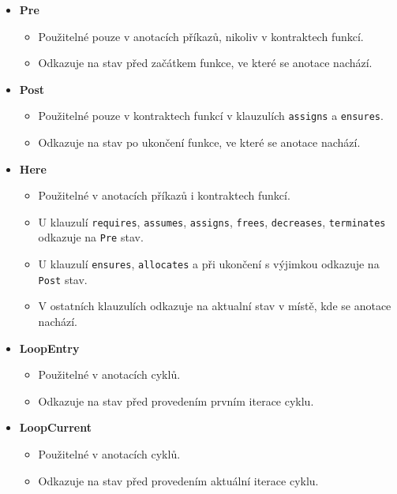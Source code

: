 \begin{itemize}
    \item \textbf{Pre}
    \begin{itemize}
        \item Použitelné pouze v anotacích příkazů, nikoliv v kontraktech funkcí.
        \item Odkazuje na stav před začátkem funkce, ve které se anotace nachází.
    \end{itemize}

    \item \textbf{Post}
    \begin{itemize}
        \item Použitelné pouze v kontraktech funkcí v klauzulích \texttt{assigns} a \texttt{ensures}.
        \item Odkazuje na stav po ukončení funkce, ve které se anotace nachází.
    \end{itemize}

    \item \textbf{Here}
    \begin{itemize}
        \item Použitelné v anotacích příkazů i kontraktech funkcí.
        \item U klauzulí \texttt{requires}, \texttt{assumes}, \texttt{assigns}, \texttt{frees}, \texttt{decreases}, \texttt{terminates} odkazuje na \texttt{Pre} stav.
        \item U klauzulí \texttt{ensures}, \texttt{allocates} a při ukončení s výjimkou odkazuje na \texttt{Post} stav.
        \item V ostatních klauzulích odkazuje na aktualní stav v místě, kde se anotace nachází.
    \end{itemize}

    \item \textbf{LoopEntry}
    \begin{itemize}
        \item Použitelné v anotacích cyklů.
        \item Odkazuje na stav před provedením prvním iterace cyklu.
    \end{itemize}

    \item \textbf{LoopCurrent}
    \begin{itemize}
        \item Použitelné v anotacích cyklů.
        \item Odkazuje na stav před provedením aktuální iterace cyklu.
    \end{itemize}


\end{itemize}
